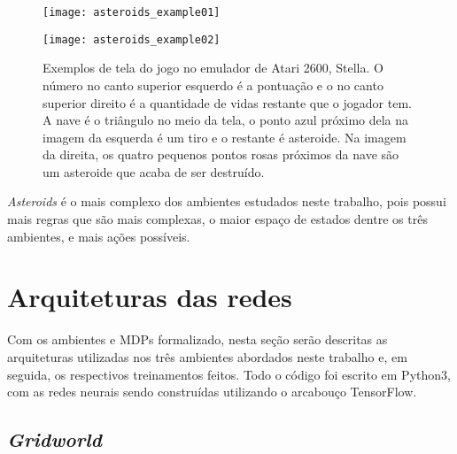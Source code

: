 \begin{figure}[h!]
  \begin{minipage}[b]{.5\textwidth}
  \centering
  \texttt{[image: asteroids\_example01]}
  \end{minipage}
  \hfill
  \begin{minipage}[b]{.5\textwidth}
  \texttt{[image: asteroids\_example02]}
  \end{minipage}
  \caption{Exemplos de tela do jogo no emulador de Atari 2600, Stella. O número no canto superior esquerdo é a pontuação e o no canto superior direito é a quantidade de vidas restante que o jogador tem. A nave é o triângulo no meio da tela, o ponto azul próximo dela na imagem da esquerda é um tiro e o restante é asteroide. Na imagem da direita, os quatro pequenos pontos rosas próximos da nave são um asteroide que acaba de ser destruído.}
\end{figure}

\textit{Asteroids} é o mais complexo dos ambientes estudados neste trabalho, pois possui mais regras que são mais complexas, o maior espaço de estados dentre os três ambientes, e mais ações possíveis. 



\section{Arquiteturas das redes}
\label{sec:arq}

Com os ambientes e MDPs formalizado, nesta seção serão descritas as arquiteturas utilizadas nos três ambientes abordados neste trabalho e, em seguida, os respectivos treinamentos feitos.
Todo o código foi escrito em Python3, com as redes neurais sendo construídas utilizando o arcabouço TensorFlow.

\subsection{\textit{Gridworld}}
\label{sec:arq_gw}


